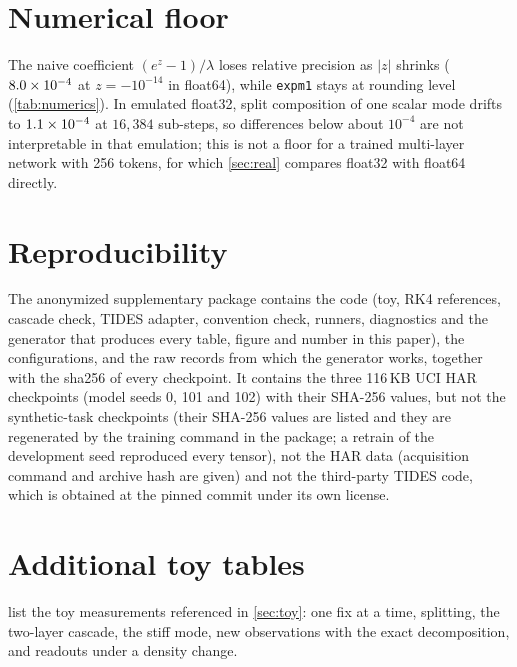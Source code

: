 \documentclass{article}
\theoremstyle{plain}
\theoremstyle{definition}
\theoremstyle{remark}
\begin{document}
\FloatBarrier
\section{Numerical floor}
\label{app:numerics}

The naive coefficient $(e^{z}-1)/\lambda$ loses relative precision as $|z|$ shrinks ($8.0\times10^{-4}$ at $z{=}-10^{-14}$ in float64), while \texttt{expm1} stays at rounding level (\cref{tab:numerics}).
In emulated float32, split composition of one scalar mode drifts to $1.1\times10^{-4}$ at $16{,}384$ sub-steps, so differences below about $10^{-4}$ are not interpretable in that emulation; this is not a floor for a trained multi-layer network with 256 tokens, for which \cref{sec:real} compares float32 with float64 directly.



\FloatBarrier
\section{Reproducibility}
\label{app:repro}

The anonymized supplementary package contains the code (toy, RK4 references, cascade check, TIDES adapter, convention check, runners, diagnostics and the generator that produces every table, figure and number in this paper), the configurations, and the raw records from which the generator works, together with the sha256 of every checkpoint.
It contains the three 116\,KB UCI HAR checkpoints (model seeds 0, 101 and 102) with their SHA-256 values, but not the synthetic-task checkpoints (their SHA-256 values are listed and they are regenerated by the training command in the package; a retrain of the development seed reproduced every tensor), not the HAR data (acquisition command and archive hash are given) and not the third-party TIDES code, which is obtained at the pinned commit under its own license.

\FloatBarrier
\section{Additional toy tables}
\label{app:toy}

 list the toy measurements referenced in \cref{sec:toy}: one fix at a time, splitting, the two-layer cascade, the stiff mode, new observations with the exact decomposition, and readouts under a density change.








\FloatBarrier
\end{document}
